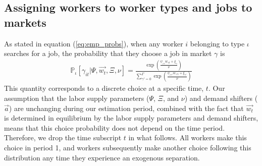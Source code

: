 \documentclass[12pt]{article}
\def\ig{\iota\gamma}
\def\g{\gamma}
\def\i{\iota}
\renewcommand{\P}{\mathbb {P}}
\theoremstyle{definition}
\theoremstyle{plain}
\begin{document}
\label{sec:bisbm}

\subsection{Assigning workers to worker types and jobs to markets}


As stated in equation (\ref{eq:emp_probs}), when any worker $i$ belonging to type $\i$ searches for a job, the probability that they choose a job in market $\g$ is
\begin{align*}
\P_{\i}[\g_{it}|\Psi,\vec{w_t},\Xi,\nu]= \frac{\exp \left( \frac{\psi_{\ig} w_{\g t} + \xi_{\g}}{\nu} \right) }{ \sum\limits_{\g'=0}^{\Gamma} \exp \left( \frac{\psi_{\ig'} w_{\g' t} + \xi_{\g'}}{\nu} \right) }
\end{align*}
This quantity corresponds to a discrete choice at a specific time, $t$. Our assumption that the labor supply parameters ($\Psi$, $\Xi$, and $\nu$) and demand shifters ($\vec{a}$) are unchanging during our estimation period, combined with the fact that $\vec{w_t}$ is determined in equilibrium by the labor supply parameters and demand shifters, means that this choice probability does not depend on the time period. Therefore, we drop the time subscript $t$ in what follows. All workers make this choice in period 1, and workers subsequently make another choice following this distribution any time they experience an exogenous separation. 
\end{document}
